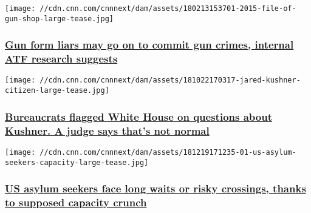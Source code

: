 \href{/2018/12/21/us/gun-form-liars-atf-invs/index.html}{}

\texttt{[image: //cdn.cnn.com/cnnnext/dam/assets/180213153701-2015-file-of-gun-shop-large-tease.jpg]}

\hypertarget{gun-form-liars-may-go-on-to-commit-gun-crimes-internal-atf-research-suggests}{%
\subsubsection{\texorpdfstring{\href{/2018/12/21/us/gun-form-liars-atf-invs/index.html}{Gun
form liars may go on to commit gun crimes, internal ATF research
suggests}}{Gun form liars may go on to commit gun crimes, internal ATF research suggests}}\label{gun-form-liars-may-go-on-to-commit-gun-crimes-internal-atf-research-suggests}}

\href{/2018/12/20/politics/kushner-white-house-foia/index.html}{}

\texttt{[image: //cdn.cnn.com/cnnnext/dam/assets/181022170317-jared-kushner-citizen-large-tease.jpg]}

\hypertarget{bureaucrats-flagged-white-house-on-questions-about-kushner-a-judge-says-thats-not-normal}{%
\subsubsection{\texorpdfstring{\href{/2018/12/20/politics/kushner-white-house-foia/index.html}{Bureaucrats
flagged White House on questions about Kushner. A judge says that's not
normal}}{Bureaucrats flagged White House on questions about Kushner. A judge says that's not normal}}\label{bureaucrats-flagged-white-house-on-questions-about-kushner-a-judge-says-thats-not-normal}}

\href{/2018/12/20/us/us-asylum-seeker-southwest-border-capacity-invs/index.html}{}

\texttt{[image: //cdn.cnn.com/cnnnext/dam/assets/181219171235-01-us-asylum-seekers-capacity-large-tease.jpg]}

\hypertarget{us-asylum-seekers-face-long-waits-or-risky-crossings-thanks-to-supposed-capacity-crunch}{%
\subsubsection{\texorpdfstring{\href{/2018/12/20/us/us-asylum-seeker-southwest-border-capacity-invs/index.html}{US
asylum seekers face long waits or risky crossings, thanks to supposed
capacity
crunch}}{US asylum seekers face long waits or risky crossings, thanks to supposed capacity crunch}}\label{us-asylum-seekers-face-long-waits-or-risky-crossings-thanks-to-supposed-capacity-crunch}}

